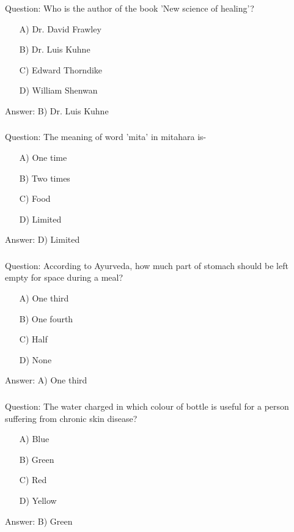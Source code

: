 \begin{frame}[fragile]\frametitle{}

Question: Who is the author of the book 'New science of healing'?

\begin{itemize}
\item[A)] Dr. David Frawley
\item[B)] Dr. Luis Kuhne
\item[C)] Edward Thorndike
\item[D)] William Shenwan
\end{itemize}

Answer: B) Dr. Luis Kuhne
\end{frame}

\begin{frame}[fragile]\frametitle{}

Question: The meaning of word 'mita' in mitahara is-

\begin{itemize}
\item[A)] One time
\item[B)] Two times
\item[C)] Food
\item[D)] Limited
\end{itemize}

Answer: D) Limited
\end{frame}

\begin{frame}[fragile]\frametitle{}

Question: According to Ayurveda, how much part of stomach should be left empty for space during a meal?

\begin{itemize}
\item[A)] One third
\item[B)] One fourth
\item[C)] Half
\item[D)] None
\end{itemize}

Answer: A) One third
\end{frame}

\begin{frame}[fragile]\frametitle{}

Question: The water charged in which colour of bottle is useful for a person suffering from chronic skin disease?

\begin{itemize}
\item[A)] Blue
\item[B)] Green
\item[C)] Red
\item[D)] Yellow
\end{itemize}

Answer: B) Green
\end{frame}

